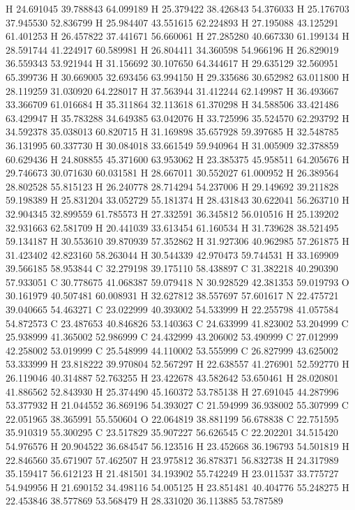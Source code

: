 \documentclass{article}
\begin{document}
H 24.691045 39.788843 64.099189
H 25.379422 38.426843 54.376033
H 25.176703 37.945530 52.836799
H 25.984407 43.551615 62.224893
H 27.195088 43.125291 61.401253
H 26.457822 37.441671 56.660061
H 27.285280 40.667330 61.199134
H 28.591744 41.224917 60.589981
H 26.804411 34.360598 54.966196
H 26.829019 36.559343 53.921944
H 31.156692 30.107650 64.344617
H 29.635129 32.560951 65.399736
H 30.669005 32.693456 63.994150
H 29.335686 30.652982 63.011800
H 28.119259 31.030920 64.228017
H 37.563944 31.412244 62.149987
H 36.493667 33.366709 61.016684
H 35.311864 32.113618 61.370298
H 34.588506 33.421486 63.429947
H 35.783288 34.649385 63.042076
H 33.725996 35.524570 62.293792
H 34.592378 35.038013 60.820715
H 31.169898 35.657928 59.397685
H 32.548785 36.131995 60.337730
H 30.084018 33.661549 59.940964
H 31.005909 32.378859 60.629436
H 24.808855 45.371600 63.953062
H 23.385375 45.958511 64.205676
H 29.746673 30.071630 60.031581
H 28.667011 30.552027 61.000952
H 26.389564 28.802528 55.815123
H 26.240778 28.714294 54.237006
H 29.149692 39.211828 59.198389
H 25.831204 33.052729 55.181374
H 28.431843 30.622041 56.263710
H 32.904345 32.899559 61.785573
H 27.332591 36.345812 56.010516
H 25.139202 32.931663 62.581709
H 20.441039 33.613454 61.160534
H 31.739628 38.521495 59.134187
H 30.553610 39.870939 57.352862
H 31.927306 40.962985 57.261875
H 31.423402 42.823160 58.263044
H 30.544339 42.970473 59.744531
H 33.169909 39.566185 58.953844
C 32.279198 39.175110 58.438897
C 31.382218 40.290390 57.933051
C 30.778675 41.068387 59.079418
N 30.928529 42.381353 59.019793
O 30.161979 40.507481 60.008931
H 32.627812 38.557697 57.601617
N 22.475721 39.040665 54.463271
C 23.022999 40.393002 54.533999
H 22.255798 41.057584 54.872573
C 23.487653 40.846826 53.140363
C 24.633999 41.823002 53.204999
C 25.938999 41.365002 52.986999
C 24.432999 43.206002 53.490999
C 27.012999 42.258002 53.019999
C 25.548999 44.110002 53.555999
C 26.827999 43.625002 53.333999
H 23.818222 39.970804 52.567297
H 22.638557 41.276901 52.592770
H 26.119046 40.314887 52.763255
H 23.422678 43.582642 53.650461
H 28.020801 41.886562 52.843930
H 25.374490 45.160372 53.785138
H 27.691045 44.287996 53.377932
H 21.044552 36.869196 54.393027
C 21.594999 36.938002 55.307999
C 22.051965 38.365991 55.550604
O 22.064819 38.881199 56.678838
C 22.751595 35.910319 55.300295
C 23.517829 35.907227 56.626545
C 22.202201 34.515420 54.976576
H 20.904522 36.684547 56.123516
H 23.452668 36.196793 54.501819
H 22.846560 35.671907 57.462507
H 23.975812 36.878371 56.832738
H 24.317989 35.159417 56.612123
H 21.481501 34.193902 55.742249
H 23.011537 33.775727 54.949956
H 21.690152 34.498116 54.005125
H 23.851481 40.404776 55.248275
H 22.453846 38.577869 53.568479
H 28.331020 36.113885 53.787589
~    
   
\end{document}
